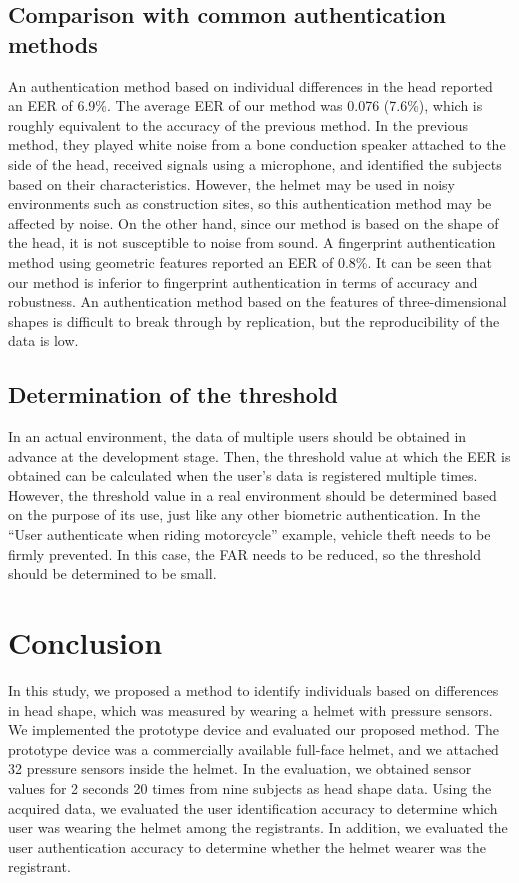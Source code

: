 \documentclass[english,preprint,JIP]{ipsj}
\begin{document}
\subsection{Comparison with common authentication methods}
\label{sec:comparison_of_performance}
An authentication method based on individual differences in the head\cite{skull_auth} reported an EER of 6.9\%. The average EER of our method was 0.076 (7.6\%), which is roughly equivalent to the accuracy of the previous method. In the previous method, they played white noise from a bone conduction speaker attached to the side of the head, received signals using a microphone, and identified the subjects based on their characteristics. However, the helmet may be used in noisy environments such as construction sites, so this authentication method may be affected by noise. On the other hand, since our method is based on the shape of the head, it is not susceptible to noise from sound. A fingerprint authentication method using geometric features\cite{finger_geometric} reported an EER of 0.8\%. It can be seen that our method is inferior to fingerprint authentication in terms of accuracy and robustness. An authentication method based on the features of three-dimensional shapes is difficult to break through by replication, but the reproducibility of the data is low.


\subsection{Determination of the threshold}
\label{sec:determination_of_the_threshold}
In an actual environment, the data of multiple users should be obtained in advance at the development stage. Then, the threshold value at which the EER is obtained can be calculated when the user's data is registered multiple times. However, the threshold value in a real environment should be determined based on the purpose of its use, just like any other biometric authentication. In the ``User authenticate when riding motorcycle'' example, vehicle theft needs to be firmly prevented. In this case, the FAR needs to be reduced, so the threshold should be determined to be small.



\section{Conclusion}
\label{sec:conclusion}
In this study, we proposed a method to identify individuals based on differences in head shape, which was measured by wearing a helmet with pressure sensors. We implemented the prototype device and evaluated our proposed method. The prototype device was a commercially available full-face helmet, and we attached 32 pressure sensors inside the helmet. In the evaluation, we obtained sensor values for 2 seconds 20 times from nine subjects as head shape data. Using the acquired data, we evaluated the user identification accuracy to determine which user was wearing the helmet among the registrants. In addition, we evaluated the user authentication accuracy to determine whether the helmet wearer was the registrant.\par
\end{document}
